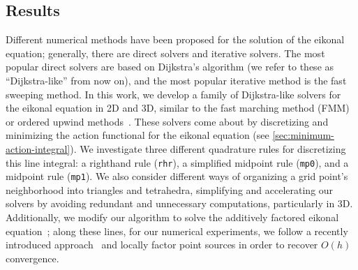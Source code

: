 \documentclass[eikonal.tex]{subfiles}
\begin{document}
\subsection{Results}

Different numerical methods have been proposed for the solution of the
eikonal equation; generally, there are direct solvers and iterative
solvers. The most popular direct solvers are based on Dijkstra's
algorithm (we refer to these as ``Dijkstra-like'' from now on), and
the most popular iterative method is the fast sweeping method. In this
work, we develop a family of Dijkstra-like solvers for the eikonal
equation in 2D and 3D, similar to the fast marching method (FMM) or
ordered upwind
methods~\cite{sethian1996fast,sethian2003ordered}. These solvers come
about by discretizing and minimizing the action functional for the
eikonal equation (see \cref{sec:minimum-action-integral}). We
investigate three different quadrature rules for discretizing this
line integral: a righthand rule (\texttt{rhr}), a simplified midpoint
rule (\texttt{mp0}), and a midpoint rule (\texttt{mp1}). We also
consider different ways of organizing a grid point's neighborhood into
triangles and tetrahedra, simplifying and accelerating our solvers by
avoiding redundant and unnecessary computations, particularly in
3D. Additionally, we modify our algorithm to solve the additively
factored eikonal equation~\cite{luo2012fast}; along these lines, for
our numerical experiments, we follow a recently introduced
approach~\cite{qi2018corner} and locally factor point sources in order
to recover $O(h)$ convergence.
\end{document}
